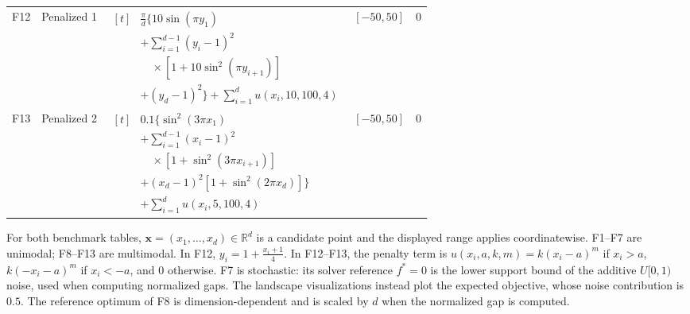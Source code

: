 \begin{table}[H]
\begin{tabularx}{\textwidth}{c>{\raggedright\arraybackslash}p{2.2cm}>{\footnotesize\raggedright\arraybackslash}X cc}
F12 & Penalized 1 & $\begin{aligned}[t]&\tfrac{\pi}{d}\Big\{10\sin(\pi y_1)\\&+\textstyle\sum_{i=1}^{d-1}(y_i-1)^2\\&\quad\times\left[1+10\sin^2(\pi y_{i+1})\right]\\&+(y_d-1)^2\Big\}+\textstyle\sum_{i=1}^{d}u(x_i,10,100,4)\end{aligned}$ & $[-50,50]$ & $0$ \\
F13 & Penalized 2 & $\begin{aligned}[t]&0.1\Big\{\sin^2(3\pi x_1)\\&+\textstyle\sum_{i=1}^{d-1}(x_i-1)^2\\&\quad\times\left[1+\sin^2(3\pi x_{i+1})\right]\\&+(x_d-1)^2\left[1+\sin^2(2\pi x_d)\right]\Big\}\\&+\textstyle\sum_{i=1}^{d}u(x_i,5,100,4)\end{aligned}$ & $[-50,50]$ & $0$ \\
\bottomrule
\end{tabularx}
\noindent\footnotesize
For both benchmark tables, $\mathbf{x}=(x_1,\ldots,x_d)\in\mathbb{R}^d$ is a candidate point and the displayed range applies coordinatewise. F1--F7 are unimodal; F8--F13 are multimodal. In F12, $y_i = 1+\tfrac{x_i+1}{4}$. In F12--F13, the penalty term is
$u(x_i,a,k,m) = k(x_i-a)^{m}$ if $x_i>a$, $k(-x_i-a)^{m}$ if $x_i<-a$, and $0$ otherwise.
F7 is stochastic: its solver reference $f^*=0$ is the lower support bound of the additive $U[0,1)$ noise, used when computing normalized gaps. The landscape visualizations instead plot the expected objective, whose noise contribution is $0.5$.
The reference optimum of F8 is dimension-dependent and is scaled by $d$ when the normalized gap is computed.
\end{table}
